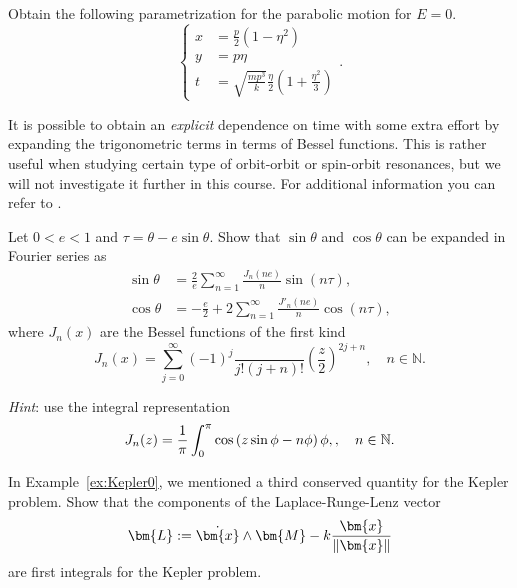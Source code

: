 \documentclass[english,fontsize=11pt,paper=a5,oneside]{scrbook}
\newcommand{\N}{\mathbb{N}}
\newcommand{\bx}{\bm{x}}
\let\d\relax
\DeclareMathOperator{\d}{d}
\theoremstyle{definition}
\newenvironment{exercise}
  {\pushQED{\qed}\renewcommand{\qedsymbol}{$\maltese$}\exercisex}
  {\popQED\endexercisex}
\begin{document}
\begin{exercise}
    Obtain the following parametrization for the parabolic motion for $E=0$.
    \begin{equation}
        \left\lbrace
        \begin{aligned}
            x &= \frac p2 \left(1- \eta^2\right)\\
            y &= p\eta\\
            t &= \sqrt{\frac{mp^3}k}\frac\eta2\left(1+\frac{\eta^2}3\right)
        \end{aligned}
        \right..
    \end{equation}
\end{exercise}

It is possible to obtain an \emph{explicit} dependence on time with some extra effort by expanding the trigonometric terms in terms of Bessel functions. This is rather useful when studying certain type of orbit-orbit or spin-orbit resonances, but we will not investigate it further in this course. For additional information you can refer to \cite{book:arnoldcelestial, book:celletti}.

\begin{exercise}
    Let $0<e<1$ and $\tau = \theta - e\sin\theta$.
    Show that $\sin\theta$ and $\cos\theta$ can be expanded in Fourier series as
    \begin{align}
        \sin\theta &= \frac2e \sum_{n=1}^\infty \frac{J_n(ne)}{n} \sin(n\tau),\\
        \cos\theta &= -\frac e2 + 2 \sum_{n=1}^\infty \frac{J'_n(ne)}{n} \cos(n\tau),
    \end{align}
    where $J_n(x)$ are the Bessel functions of the first kind 
    \begin{equation}
        J_n(x) = \sum_{j=0}^\infty (-1)^j\frac{}{j!(j+n)!}\left(\frac z2\right)^{2j+n}, \quad n\in\N.
    \end{equation}

    \emph{Hint}: use the integral representation
    \begin{equation}
        J_n(z) = \frac1\pi \int_0^\pi \cos\left(z\sin\phi - n \phi\right)\d\phi,, \quad n\in\N.
    \end{equation}
\end{exercise}

In Example~\ref{ex:Kepler0}, we mentioned a third conserved quantity for the Kepler problem.
\begin{exercise}
    Show that the components of the Laplace-Runge-Lenz vector
    \begin{equation}
        \bm{L} := \dot \bx\wedge \bm{M} - k \frac{\bx}{\|\bx\|}
    \end{equation}
    are first integrals for the Kepler problem.
\end{exercise}
\end{document}
